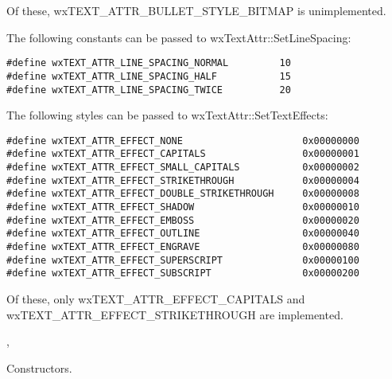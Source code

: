 Of these, wxTEXT\_ATTR\_BULLET\_STYLE\_BITMAP is unimplemented.

The following constants can be passed to wxTextAttr::SetLineSpacing:

{\small
\begin{verbatim}
#define wxTEXT_ATTR_LINE_SPACING_NORMAL         10
#define wxTEXT_ATTR_LINE_SPACING_HALF           15
#define wxTEXT_ATTR_LINE_SPACING_TWICE          20
\end{verbatim}
}

The following styles can be passed to wxTextAttr::SetTextEffects:

{\small
\begin{verbatim}
#define wxTEXT_ATTR_EFFECT_NONE                     0x00000000
#define wxTEXT_ATTR_EFFECT_CAPITALS                 0x00000001
#define wxTEXT_ATTR_EFFECT_SMALL_CAPITALS           0x00000002
#define wxTEXT_ATTR_EFFECT_STRIKETHROUGH            0x00000004
#define wxTEXT_ATTR_EFFECT_DOUBLE_STRIKETHROUGH     0x00000008
#define wxTEXT_ATTR_EFFECT_SHADOW                   0x00000010
#define wxTEXT_ATTR_EFFECT_EMBOSS                   0x00000020
#define wxTEXT_ATTR_EFFECT_OUTLINE                  0x00000040
#define wxTEXT_ATTR_EFFECT_ENGRAVE                  0x00000080
#define wxTEXT_ATTR_EFFECT_SUPERSCRIPT              0x00000100
#define wxTEXT_ATTR_EFFECT_SUBSCRIPT                0x00000200
\end{verbatim}
}

Of these, only wxTEXT\_ATTR\_EFFECT\_CAPITALS and wxTEXT\_ATTR\_EFFECT\_STRIKETHROUGH are implemented.


, 


\label{wxtextattrwxtextattr}




Constructors.

\label{wxtextattrapply}


